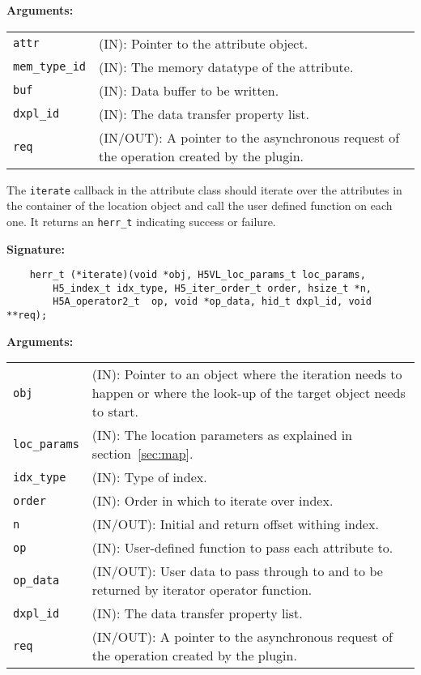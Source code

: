 \textbf{Arguments:}\\
\begin{tabular}{l p{10cm}}
  {\tt attr} & (IN): Pointer to the attribute object.\\
  {\tt mem\_type\_id} & (IN): The memory datatype of the attribute.\\
  {\tt buf} & (IN): Data buffer to be written.\\
  {\tt dxpl\_id} & (IN): The data transfer property list.\\
  {\tt req} & (IN/OUT): A pointer to the asynchronous request of the
  operation created by the plugin.\\
\end{tabular}

The {\tt iterate} callback in the attribute class should iterate over
the attributes in the container of the location object and call the
user defined function on each one. It returns an {\tt herr\_t}
indicating success or failure.

\textbf{Signature:}
\begin{lstlisting}
    herr_t (*iterate)(void *obj, H5VL_loc_params_t loc_params,
        H5_index_t idx_type, H5_iter_order_t order, hsize_t *n, 
        H5A_operator2_t  op, void *op_data, hid_t dxpl_id, void **req);
\end{lstlisting}

\textbf{Arguments:}\\
\begin{tabular}{l p{10cm}}
  {\tt obj} & (IN): Pointer to an object where the iteration needs
  to happen or where the look-up of the target object needs to
  start.\\
  {\tt loc\_params} & (IN): The location parameters as
  explained in section~\ref{sec:map}.\\
  {\tt idx\_type} & (IN): Type of index.\\
  {\tt order} & (IN): Order in which to iterate over index.\\
  {\tt n} & (IN/OUT): Initial and return offset withing index.\\
  {\tt op} & (IN): User-defined function to pass each
  attribute to. \\
  {\tt op\_data} & (IN/OUT): User data to pass through to and to be
  returned by iterator operator function. \\
  {\tt dxpl\_id} & (IN): The data transfer property list.\\
  {\tt req} & (IN/OUT): A pointer to the asynchronous request of the
  operation created by the plugin.\\
\end{tabular}


